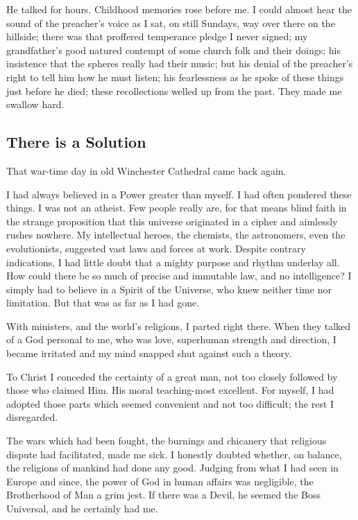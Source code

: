 He talked for hours.
Childhood memories rose before me.
I could almost hear the sound of the preacher's voice as I sat, on still Sundays, way over there on the hillside;
there was that proffered temperance pledge I never signed;
my grandfather's good natured contempt of some church folk and their doings;
his insistence that the spheres really had their music;
but his denial of the preacher's right to tell him how he must listen; 
his fearlessness as he spoke of these things just before he died; 
these recollections welled up from the past.
They made me swallow hard.


\subsection{There is a Solution}

That war-time day in old Winchester Cathedral came back again.

I had always believed in a Power greater than myself.
I had often pondered these things.
I was not an atheist.
Few people really are, for that means blind faith in the strange proposition that this universe originated in a cipher and aimlessly rushes nowhere.
My intellectual heroes, the chemists, the astronomers, even the evolutionists, suggested vast laws and forces at work.
Despite contrary indications, I had little doubt that a mighty purpose and rhythm underlay all.
How could there be so much of precise and immutable law, and no intelligence?
I simply had to believe in a Spirit of the Universe, who knew neither time nor limitation.
But that was as far as I had gone.

With ministers, and the world's religions, I parted right there.
When they talked of a God personal to me, who was love, superhuman strength and direction, I became irritated and my mind snapped shut against such a theory.

To Christ I conceded the certainty of a great man, not too closely followed by those who claimed Him.
His moral teaching-most excellent.
For myself, I had adopted those parts which seemed convenient and not too difficult;
the rest I disregarded.

The wars which had been fought, the burnings and chicanery that religious dispute had facilitated, made me sick.
I honestly doubted whether, on balance, the religions of mankind had done any good.
Judging from what I had seen in Europe and since, the power of God in human affairs was negligible, the Brotherhood of Man a grim jest.
If there was a Devil, he seemed the Boss Universal, and he certainly had me.

